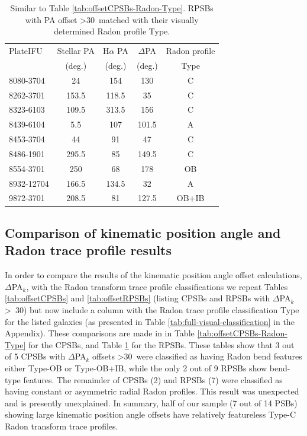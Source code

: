\begin{table}
\centering
\caption[RPSBs with PA offset \textgreater 30\textdegree\ matched with their visually determined Radon profile Type]{Similar to Table \ref{tab:offsetCPSBs-Radon-Type}. RPSBs with PA offset \textgreater 30\textdegree\ matched with their visually determined Radon profile Type.}
\label{tab:offsetRPSBs-Radon-Type}
\begin{tabular}{lcccc}
\hline
PlateIFU   & Stellar PA & H$\alpha$ PA & $\Delta$PA & Radon profile \\
  & (deg.) & (deg.) & (deg.) & Type\\
\hline
8080-3704 & 24 & 154 & 130 & C \\
8262-3701 & 153.5 & 118.5 & 35 & C \\
8323-6103 & 109.5 & 313.5 & 156 & C \\
8439-6104 & 5.5 & 107 & 101.5 & A \\
8453-3704 & 44 & 91 & 47 & C \\
8486-1901 & 295.5 & 85 & 149.5 & C \\
8554-3701 & 250 & 68 & 178 & OB \\
8932-12704 & 166.5 & 134.5 & 32 & A \\
9872-3701 & 208.5 & 81 & 127.5 & OB+IB \\
\hline
\end{tabular}
\end{table}

\subsection[Comparison of kinematic position angle and Radon trace profile results]{Comparison of kinematic position angle and Radon trace profile results}
\label{sec:comparison-of-results}
In order to compare the results of the kinematic position angle offset calculations, $\Delta$PA$_{k}$, with the Radon transform trace profile classifications we repeat Tables \ref{tab:offsetCPSBs} and \ref{tab:offsetRPSBs} (listing CPSBs and RPSBs with $\Delta$PA$_{k}$ \textgreater\ 30\textdegree) but now include a column with the Radon trace profile classification Type for the listed galaxies (as presented in  Table \ref{tab:full-visual-classification} in the Appendix). These comparisons are made in in Table \ref{tab:offsetCPSBs-Radon-Type} for the CPSBs, and Table  \ref{tab:offsetRPSBs-Radon-Type} for the RPSBs. 
These tables show that 3 out of 5 CPSBs with $\Delta$PA$_{k}$ offsets \textgreater 30\textdegree\ were classified as having Radon bend features either Type-OB or Type-OB+IB, while the only 2 out of 9 RPSBs show bend-type features. The remainder of CPSBs (2) and RPSBs (7) were classified as having constant or asymmetric radial Radon profiles. This result was unexpected and is presently unexplained. In summary, half of our sample (7 out of 14 PSBs) showing large kinematic position angle offsets have relatively featureless Type-C Radon transform trace profiles.

